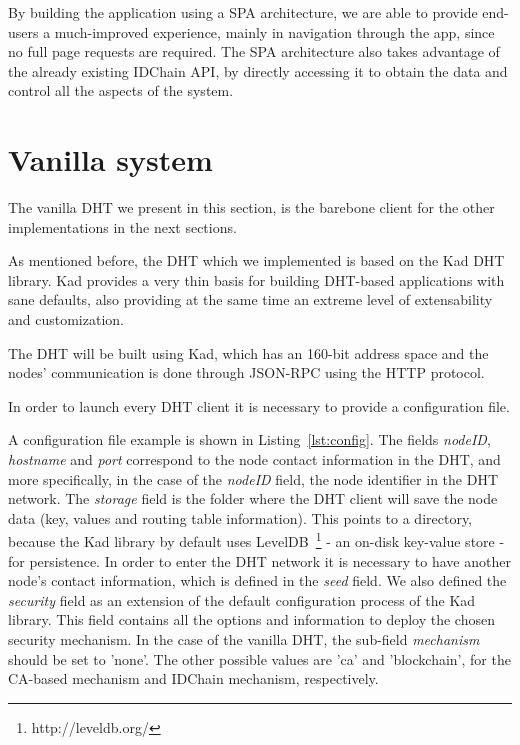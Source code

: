 By building the application using a SPA architecture, we are able to provide end-users a much-improved experience, mainly in navigation through the app, since no full page requests are required.
The \ac{SPA} architecture also takes advantage of the already existing IDChain API, by directly accessing it to obtain the data and control all the aspects of the system.

\section{Vanilla system}

The vanilla \ac{DHT} we present in this section, is the barebone client for the other implementations in the next sections.

As mentioned before, the \ac{DHT} which we implemented is based on the Kad DHT library.
Kad provides a very thin basis for building DHT-based applications with sane defaults, also providing at the same time an extreme level of extensability and customization.

The DHT will be built using Kad, which has an 160-bit address space and the nodes' communication is done through JSON-RPC using the \ac{HTTP} protocol.

In order to launch every DHT client it is necessary to provide a configuration file.



A configuration file example is shown in Listing~\ref{lst:config}.
The fields \textit{nodeID}, \textit{hostname} and \textit{port} correspond to the node contact information in the DHT, and more specifically, in the case of the \textit{nodeID} field, the node identifier in the DHT network.
The \textit{storage} field is the folder where the DHT client will save the node data (key, values and routing table information). This points to a directory, because the Kad library by default uses LevelDB~\footnote{http://leveldb.org/} - an on-disk key-value store - for persistence.
In order to enter the DHT network it is necessary to have another node's contact information, which is defined in the \textit{seed} field.
We also defined the \textit{security} field as an extension of the default configuration process of the Kad library.
This field contains all the options and information to deploy the chosen security mechanism.
In the case of the vanilla DHT, the sub-field \textit{mechanism} should be set to 'none'.
The other possible values are 'ca' and 'blockchain', for the CA-based mechanism and IDChain mechanism, respectively.

